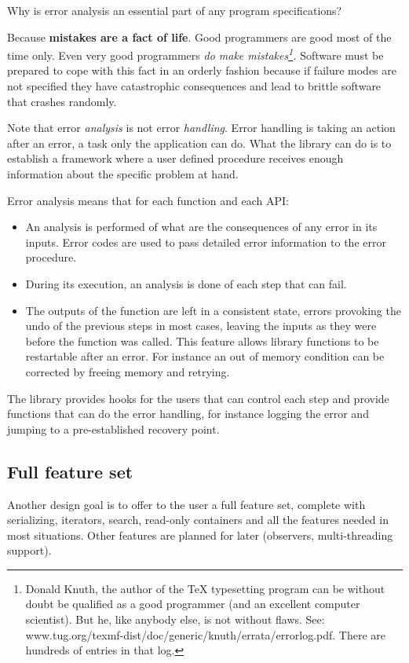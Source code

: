 \documentclass[12pt,a4paper]{memoir} %
\begin{document}
Why is error analysis an essential part of any program specifications?

Because \textbf{mistakes are a fact of life}. Good programmers are good most of the time only. Even very good programmers \textsl{do make mistakes\footnote{Donald Knuth, the author of the TeX typesetting program can be without doubt be qualified as a good programmer (and an excellent computer scientist). But he, like anybody else, is not without flaws. See: 
www.tug.org/texmf-dist/doc/generic/knuth/errata/errorlog.pdf. There are hundreds of entries in that log.}.} Software
must be prepared to cope with this fact in an orderly fashion because if failure modes are not specified they have catastrophic consequences and lead
to brittle software that crashes randomly.

Note that error \textsl{analysis} is not error \textsl{handling}. Error handling is taking an action after an error, a task only the application can do.
What the library can do is to establish a framework where a user defined procedure receives enough information about the specific problem at hand.

Error analysis means that for each function and each API:
\begin{itemize}
\item An analysis is performed of what are the consequences of any error in its inputs. Error codes are used to pass detailed error information
to the error procedure.
\item During its execution, an analysis is done of each step that can fail.
\item The outputs of the function are left in a consistent state, errors provoking the undo of the previous steps in most cases, leaving the inputs
as they were before the function was called. This feature allows library functions to be restartable after an error. For instance an out of memory
condition can be corrected by freeing memory and retrying.
\end{itemize}
The library provides hooks for the users that can control each step and provide functions that can do the error handling, for instance logging the
error and jumping to a pre-established recovery point.
\subsection{Full feature set}
Another design goal is to offer to the user a full feature set, complete with serializing, iterators, search, read-only containers and all the features 
needed in most
situations. Other features are planned for later (observers, multi-threading support).
\end{document}
